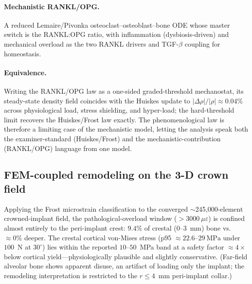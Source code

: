 \paragraph{Mechanistic RANKL/OPG.} A reduced Lemaire/Pivonka osteoclast--osteoblast--bone ODE whose
master switch is the RANKL:OPG ratio, with inflammation (dysbiosis-driven) and mechanical overload as
the two RANKL drivers and TGF-$\beta$ coupling for homeostasis.

\paragraph{Equivalence.} Writing the RANKL/OPG law as a one-sided graded-threshold mechanostat, its
steady-state density field coincides with the Huiskes update to $|\Delta\rho|/|\rho|\approx0.04\%$
across physiological load, stress shielding, and hyper-load; the hard-threshold limit recovers the
Huiskes/Frost law exactly. The phenomenological law is therefore a limiting case of the mechanistic
model, letting the analysis speak both the examiner-standard (Huiskes/Frost) and the
mechanistic-contribution (RANKL/OPG) language from one model.

\subsection{FEM-coupled remodeling on the 3-D crown field}
Applying the Frost microstrain classification to the converged $\sim$245{,}000-element crowned-implant
field, the pathological-overload window ($>\!3000~\mu\varepsilon$) is confined almost entirely to the
peri-implant crest: $9.4\%$ of crestal ($0$--$3$~mm) bone vs.\ $\approx\!0\%$ deeper. The crestal
cortical von-Mises stress (p95 $\approx 22.6$--$29~\mathrm{MPa}$ under $100$~N at $30^\circ$) lies within
the reported $10$--$50$~MPa band \citep{GengTanLiu2001,Baggi2008,Gosai2024} at a safety factor
$\approx\!4\times$ below cortical yield---physiologically plausible and slightly conservative.
(Far-field alveolar bone shows apparent disuse, an artifact of loading only the implant; the
remodeling interpretation is restricted to the $r\le4$~mm peri-implant collar.)

